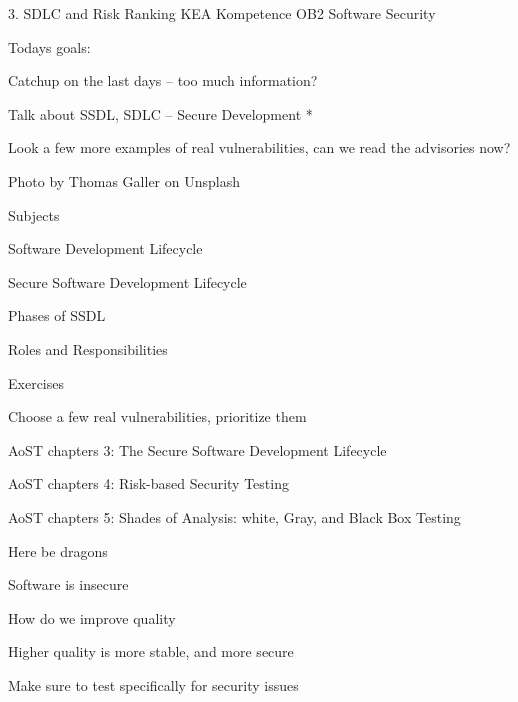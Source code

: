 \documentclass[Screen16to9,17pt]{foils}
\begin{document}
\mytitlepage
{3. SDLC and Risk Ranking}
{KEA Kompetence OB2 Software Security}



Todays goals:
\begin{list2}
\item Catchup on the last days -- too much information?
\item Talk about SSDL, SDLC -- Secure Development *
\item Look a few more examples of real vulnerabilities, can we read the advisories now?
\end{list2}

  Photo by Thomas Galler on Unsplash




\begin{list1}
\item Subjects
\begin{list2}
\item Software Development Lifecycle
\item Secure Software Development Lifecycle
\item Phases of SSDL
\item Roles and Responsibilities
\end{list2}
\item Exercises
\begin{list2}
\item Choose a few real vulnerabilities, prioritize them
\end{list2}
\end{list1}



\begin{list1}
\item AoST chapters 3: The Secure Software Development Lifecycle
\item AoST chapters 4: Risk-based Security Testing
\item AoST chapters 5: Shades of Analysis: white, Gray, and Black Box Testing
\end{list1}



Here be dragons
\begin{list2}
\item Software is insecure
\item How do we improve quality
\item Higher quality is more stable, and more secure
\item Make sure to test specifically for security issues
\end{list2}
\end{document}
